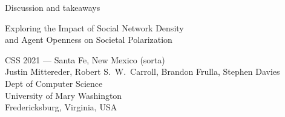 \documentclass[12pt]{beamer}
\begin{document}
\begin{frame}[c]{Discussion and takeaways}  %

\end{frame}

\begin{frame}[c]{}

\begin{center}
\Large
Exploring the Impact of Social Network Density\\and Agent Openness on Societal Polarization

\footnotesize
\vspace{.3in}
CSS 2021 --- Santa Fe, New Mexico (sorta)\\
\vspace{.1in}
Justin Mittereder, Robert S.~W.~Carroll, Brandon Frulla, Stephen Davies\\
\smallskip
\scriptsize
Dept of Computer Science\\
University of Mary Washington\\
Fredericksburg, Virginia, USA\\
\end{center}

\end{frame}
\end{document}
